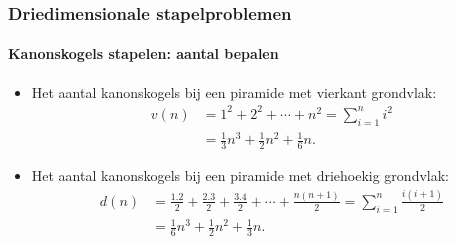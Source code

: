 \begin{frame}
\frametitle{Driedimensionale stapelproblemen}
\framesubtitle{Kanonskogels stapelen: aantal bepalen}

\begin{itemize}
	\item Het aantal kanonskogels bij een piramide met vierkant grondvlak: \begin{align*} v(n)&= 1^2 + 2^2 + \cdots + n^2= \sum_{i=1}^{n}i^2\\ &= \frac{1}{3}n^3+\frac{1}{2}n^2+\frac{1}{6}n .\end{align*}
	\item Het aantal kanonskogels bij een piramide met driehoekig grondvlak: \begin{align*} d(n) &= \frac{1.2}{2} + \frac{2.3}{2}+\frac{3.4}{2} + \cdots + \frac{n(n+1)}{2}=\sum_{i=1}^{n}\frac{i(i+1)}{2}\\ 
&=\frac{1}{6}n^3 + \frac{1}{2}n^2+\frac{1}{3}n.
\end{align*}
\end{itemize}

\end{frame}
